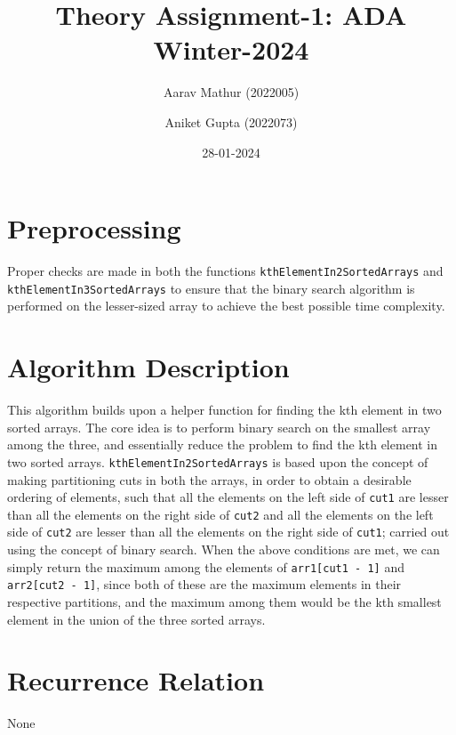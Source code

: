 \documentclass{article}
\title{Theory Assignment-1: ADA Winter-2024}
\author{Aarav Mathur (2022005) \and Aniket Gupta (2022073)}
\date{28-01-2024}
\begin{document}
\maketitle

\section{Preprocessing}
Proper checks are made in both the functions \texttt{kthElementIn2SortedArrays} and \texttt{kthElementIn3SortedArrays} to ensure that the binary search algorithm is performed on the lesser-sized array to achieve the best possible time complexity.

\section{Algorithm Description}
This algorithm builds upon a helper function for finding the kth element in two sorted arrays. The core idea is to perform binary search on the smallest array among the three, and essentially reduce the problem to find the kth element in two sorted arrays. \newline \newline \texttt{kthElementIn2SortedArrays} is based upon the concept of making partitioning cuts in both the arrays, in order to obtain a desirable ordering of elements, such that all the elements on the left side of \texttt{cut1} are lesser than all the elements on the right side of \texttt{cut2} and all the elements on the left side of \texttt{cut2} are lesser than all the elements on the right side of \texttt{cut1}; carried out using the concept of binary search. When the above conditions are met, we can simply return the maximum among the elements of \texttt{arr1[cut1 - 1]} and \texttt{arr2[cut2 - 1]}, since both of these are the maximum elements in their respective partitions, and the maximum among them would be the kth smallest element in the union of the three sorted arrays.

\section{Recurrence Relation}
None
\end{document}
